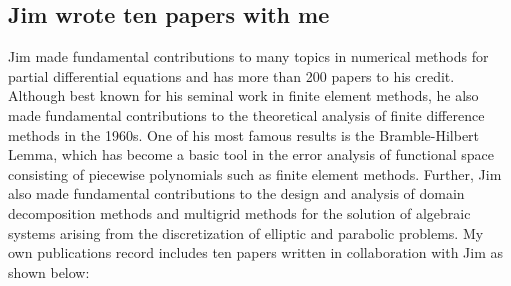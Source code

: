 \documentclass[CJK,11pt]{amsart}
\theoremstyle{definition}
\begin{document}
\begin{CJK*}{UTF8}{gbsn}
\section{Jim wrote ten papers with me}
Jim made fundamental contributions to many topics in numerical methods for partial differential equations and has more than 200 papers to his credit. Although best known for his seminal work in finite element methods, he also made fundamental contributions to the theoretical analysis of finite difference methods in the 1960s. One of his most famous results is the Bramble-Hilbert Lemma, which has become a basic tool in the error analysis of functional space consisting of piecewise polynomials such as finite element methods. Further, Jim also made fundamental contributions to the design and analysis of domain decomposition methods and multigrid methods for the solution of algebraic systems arising from the discretization of elliptic and parabolic problems. 
My own publications record includes ten papers written in collaboration with Jim \cite{bramble1988analysis,bramble1989local,bramble1990parallel,bramble1991analysis,bramble1991convergence-a,bramble1991convergence-b,bramble1991some,bramble1992multilevel,bacuta2003regularity-a,bacuta2003regularity-b} as shown below:


\end{CJK*}
\end{document}
